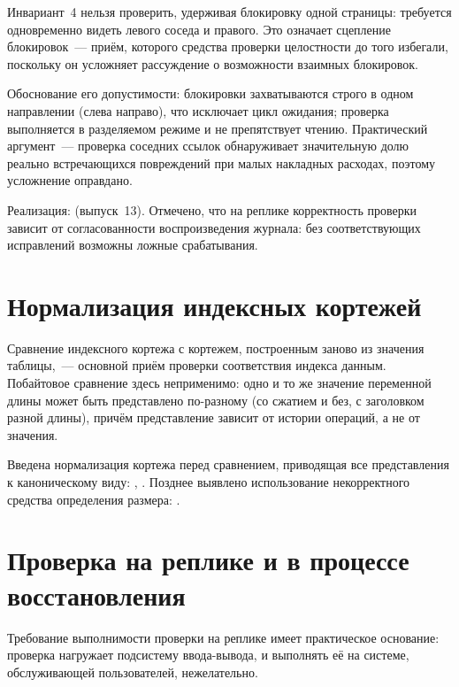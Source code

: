 Инвариант~4 нельзя проверить, удерживая блокировку одной страницы: требуется
одновременно видеть левого соседа и правого. Это означает сцепление блокировок~---
приём, которого средства проверки целостности до того избегали, поскольку он
усложняет рассуждение о возможности взаимных блокировок.

Обоснование его допустимости: блокировки захватываются строго в одном
направлении (слева направо), что исключает цикл ожидания; проверка выполняется
в разделяемом режиме и не препятствует чтению. Практический аргумент~---
проверка соседних ссылок обнаруживает значительную долю реально встречающихся
повреждений при малых накладных расходах, поэтому усложнение оправдано.

Реализация:  (выпуск~13). Отмечено, что на реплике корректность проверки зависит от
согласованности воспроизведения журнала: без соответствующих исправлений
возможны ложные срабатывания.

\section{Нормализация индексных кортежей}

Сравнение индексного кортежа с кортежем, построенным заново из значения
таблицы,~--- основной приём проверки соответствия индекса данным. Побайтовое
сравнение здесь неприменимо: одно и то же значение переменной длины может быть
представлено по-разному (со сжатием и без, с заголовком разной длины), причём
представление зависит от истории операций, а не от значения.

Введена нормализация кортежа перед сравнением, приводящая все представления к
каноническому виду: , . Позднее выявлено использование
некорректного средства определения размера: .

\section{Проверка на реплике и в процессе восстановления}

Требование выполнимости проверки на реплике имеет практическое основание:
проверка нагружает подсистему ввода-вывода, и выполнять её на системе,
обслуживающей пользователей, нежелательно.

